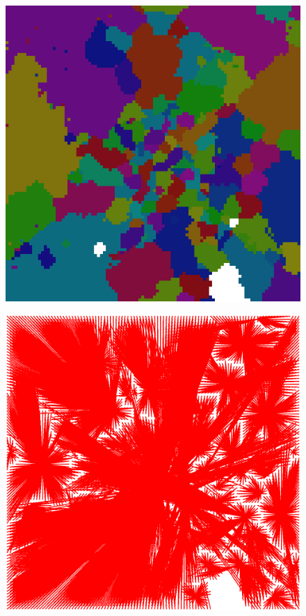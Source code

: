 \documentclass[12pt,a4paper]{article}
\begin{document}
\begin{figure}[h]
\includegraphics[scale=0.2]{wednesday.png}
\caption{}
\label{fig:patch_wed}
\end{figure}

\begin{figure}[h]
\centering
\includegraphics[scale=0.2]{wednesday_arcs.png}
\caption{}
\label{fig:arcs_wed}
\end{figure}

\
\end{document}
